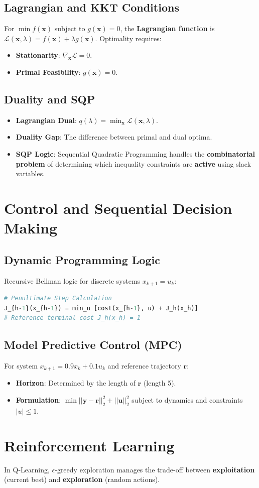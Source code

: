 \documentclass[11pt]{article}
\begin{document}
\subsection{Lagrangian and KKT Conditions}
For $\min f(\mathbf{x})$ subject to $g(\mathbf{x}) = 0$, the \textbf{Lagrangian function} is $\mathcal{L}(\mathbf{x}, \lambda) = f(\mathbf{x}) + \lambda g(\mathbf{x})$. 
Optimality requires:
\begin{itemize}
    \item \textbf{Stationarity}: $\nabla_{\mathbf{x}} \mathcal{L} = 0$.
    \item \textbf{Primal Feasibility}: $g(\mathbf{x}) = 0$.
\end{itemize}

\subsection{Duality and SQP}
\begin{itemize}
    \item \textbf{Lagrangian Dual}: $q(\lambda) = \min_{\mathbf{x}} \mathcal{L}(\mathbf{x}, \lambda)$. 
    \item \textbf{Duality Gap}: The difference between primal and dual optima.
    \item \textbf{SQP Logic}: Sequential Quadratic Programming handles the \textbf{combinatorial problem} of determining which inequality constraints are \textbf{active} using slack variables.
\end{itemize}

\section{Control and Sequential Decision Making}

\subsection{Dynamic Programming Logic}
Recursive Bellman logic for discrete systems $x_{k+1} = u_k$:
\begin{lstlisting}[language=Python]
# Penultimate Step Calculation
J_{h-1}(x_{h-1}) = min_u [cost(x_{h-1}, u) + J_h(x_h)]
# Reference terminal cost J_h(x_h) = 1
\end{lstlisting}

\subsection{Model Predictive Control (MPC)}
For system $x_{k+1} = 0.9x_k + 0.1u_k$ and reference trajectory $\mathbf{r}$:
\begin{itemize}
    \item \textbf{Horizon}: Determined by the length of $\mathbf{r}$ (length 5).
    \item \textbf{Formulation}: $\min ||\mathbf{y} - \mathbf{r}||_2^2 + ||\mathbf{u}||_2^2$ subject to dynamics and constraints $|u| \leq 1$.
\end{itemize}

\section{Reinforcement Learning}
In Q-Learning, $\epsilon$-greedy exploration manages the trade-off between \textbf{exploitation} (current best) and \textbf{exploration} (random actions).
\end{document}
